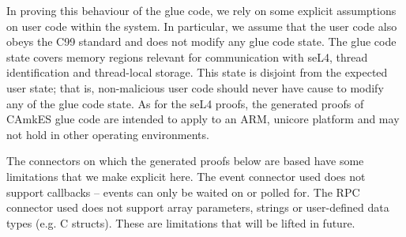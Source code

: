 In proving this behaviour of the glue code, we rely on some explicit
assumptions on user code within the system.
In particular, we assume that the user code also obeys the C99 standard and
does not modify any glue code state.
The glue code state covers memory regions relevant for communication with seL4,
thread identification and thread-local storage.
This state is disjoint from the expected user state; that is, non-malicious
user code should never have cause to modify any of the glue code state.
As for the seL4 proofs, the generated proofs of CAmkES glue code are intended
to apply to an ARM, unicore platform and may not hold in other operating
environments.

The connectors on which the generated proofs below are based have some
limitations that we make explicit here.
The event connector used does not support callbacks --
events can only be waited on or polled for.
The RPC connector used does not support array parameters, strings or
user-defined data types (e.g. C structs).
These are limitations that will be lifted in future.
